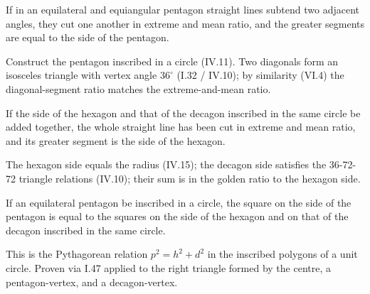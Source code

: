\begin{claim}
\label{prop:XIII.8}
If in an equilateral and equiangular pentagon straight lines subtend
two adjacent angles, they cut one another in extreme and mean ratio,
and the greater segments are equal to the side of the pentagon.
\end{claim}
\begin{evidence}
\label{ev:XIII.8}
Construct the pentagon inscribed in a circle (IV.11).  Two diagonals
form an isosceles triangle with vertex angle $36^\circ$ (I.32 / IV.10);
by similarity (VI.4) the diagonal-segment ratio matches the
extreme-and-mean ratio.
\end{evidence}

\begin{claim}
\label{prop:XIII.9}
If the side of the hexagon and that of the decagon inscribed in the
same circle be added together, the whole straight line has been cut
in extreme and mean ratio, and its greater segment is the side of
the hexagon.
\end{claim}
\begin{evidence}
\label{ev:XIII.9}
The hexagon side equals the radius (IV.15); the decagon side
satisfies the 36-72-72 triangle relations (IV.10); their sum is in
the golden ratio to the hexagon side.
\end{evidence}

\begin{claim}
\label{prop:XIII.10}
If an equilateral pentagon be inscribed in a circle, the square on
the side of the pentagon is equal to the squares on the side of the
hexagon and on that of the decagon inscribed in the same circle.
\end{claim}
\begin{evidence}
\label{ev:XIII.10}
This is the Pythagorean relation $p^2 = h^2 + d^2$ in the inscribed
polygons of a unit circle.  Proven via I.47 applied to the right
triangle formed by the centre, a pentagon-vertex, and a decagon-vertex.
\end{evidence}

